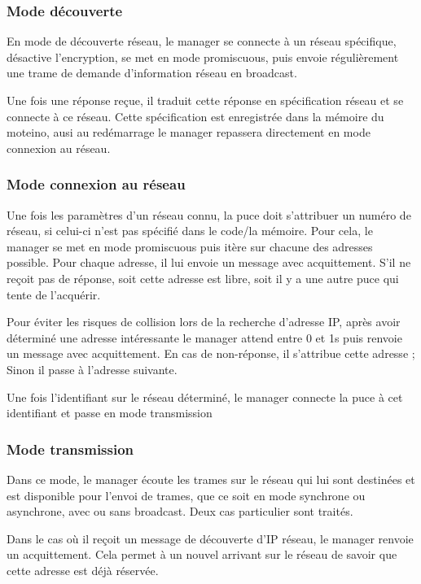 \documentclass[a4paper]{report}
\begin{document}
\subsubsection{Mode découverte}

En mode de découverte réseau, le manager se connecte à un réseau spécifique, désactive l'encryption, se met en mode promiscuous, puis envoie régulièrement une trame de demande d'information réseau en broadcast.

Une fois une réponse reçue, il traduit cette réponse en spécification réseau et se connecte à ce réseau. Cette spécification est enregistrée dans la mémoire du moteino, ausi au redémarrage le manager repassera directement en mode connexion au réseau.

\subsubsection{Mode connexion au réseau}

Une fois les paramètres d'un réseau connu, la puce doit s'attribuer un numéro de réseau, si celui-ci n'est pas spécifié dans le code/la mémoire. Pour cela, le manager se met en mode promiscuous puis itère sur chacune des adresses possible. Pour chaque adresse, il lui envoie un message avec acquittement. S'il ne reçoit pas de réponse, soit cette adresse est libre, soit il y a une autre puce qui tente de l'acquérir.

Pour éviter les risques de collision lors de la recherche d'adresse IP, après avoir déterminé une adresse intéressante le manager attend entre 0 et 1s puis renvoie un message avec acquittement. En cas de non-réponse, il s'attribue cette adresse ; Sinon il passe à l'adresse suivante.

Une fois l'identifiant sur le réseau déterminé,  le manager connecte la puce à cet identifiant et passe en mode transmission

\subsubsection{Mode transmission}

Dans ce mode, le manager écoute les trames sur le réseau qui lui sont destinées et est disponible pour l'envoi de trames, que ce soit en mode synchrone ou asynchrone, avec ou sans broadcast. Deux cas particulier sont traités.

Dans le cas où il reçoit un message de découverte d'IP réseau, le manager renvoie un acquittement. Cela permet à un nouvel arrivant sur le réseau de savoir que cette adresse est déjà réservée.
\end{document}
